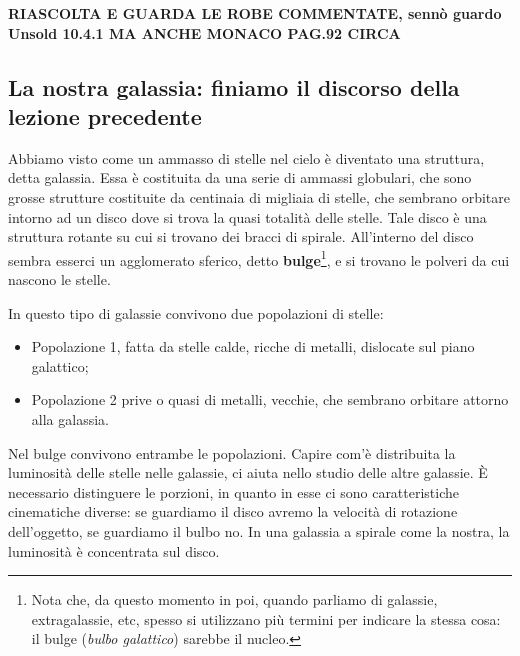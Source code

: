 

\textbf{RIASCOLTA E GUARDA LE ROBE COMMENTATE, sennò guardo Unsold 10.4.1 MA ANCHE MONACO PAG.92 CIRCA}

\subsection{La nostra galassia: finiamo il discorso della lezione precedente}
Abbiamo visto come un ammasso di stelle nel cielo è diventato una struttura, detta galassia. Essa è costituita da una serie di ammassi globulari, che sono grosse strutture costituite da centinaia di migliaia di stelle, che sembrano orbitare intorno ad un disco dove si trova la quasi totalità delle stelle. Tale disco è una struttura rotante su cui si trovano dei bracci di spirale. All'interno del disco sembra esserci un agglomerato sferico, detto \textbf{bulge}\footnote{Nota che, da questo momento in poi, quando parliamo di galassie, extragalassie, etc, spesso si utilizzano più termini per indicare la stessa cosa: il bulge (\textit{bulbo galattico}) sarebbe il nucleo.}, e si trovano le polveri da cui nascono le stelle.

In questo tipo di galassie convivono due popolazioni di stelle:

\begin{itemize}
    \item Popolazione 1, fatta da stelle calde, ricche di metalli, dislocate sul piano galattico;
    \item Popolazione 2 prive o quasi di metalli, vecchie, che sembrano orbitare attorno alla galassia.
\end{itemize}

Nel bulge convivono entrambe le popolazioni. Capire com'è distribuita la luminosità delle stelle nelle galassie, ci aiuta nello studio delle altre galassie. È necessario distinguere le porzioni, in quanto in esse ci sono caratteristiche cinematiche diverse: se guardiamo il disco avremo la velocità di rotazione dell'oggetto, se guardiamo il bulbo no. In una galassia a spirale come la nostra, la luminosità è concentrata sul disco. 

